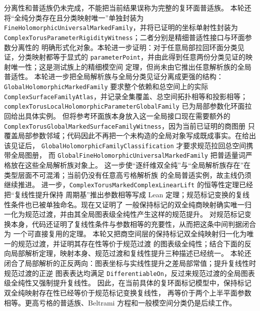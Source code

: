 \documentclass[UTF8,fontset=none,a4paper,11pt]{ctexart}
\begin{document}
分离性和普适族仍未完成，不能把当前结果误称为完整的复环面普适族。
本轮还将“全纯分类存在且分类映射唯一”单独封装为
\texttt{FineHolomorphicUniversalMarkedFamily}，并将已证明的坐标单射性封装为
\texttt{ComplexTorusParameterRigidityWitness}；二者分别是精细普适性接口与环面参数分离性的
明确形式化对象。本轮进一步证明：对于任意局部拉回环面分类见证，分类映射都等于显式的
\texttt{parameterPoint}，并由此得到任意两份分类见证的映射唯一性；这是测试族上的精细模空间
定理，但尚未由它推出任意解析族的全局普适性。
本轮进一步把全局解析族与全局分类见证分离成更强的结构：
\texttt{GlobalHolomorphicMarked\allowbreak Family} 要求整个依赖和总空间上的实际
\texttt{ComplexSurfaceFamily\allowbreak Atlas}，并记录全集覆盖、总空间拓扑相等和投影相等；
\texttt{complexTorusLocalHolomorphicParameter\allowbreak GlobalFamily} 已为局部参数化环面拉回给出具体实例。
但将参考环面族本身放入这一全局接口现在需要额外的
\texttt{ComplexTorusGlobalMarked\allowbreak SurfaceFamily\allowbreak Witness}，因为当前已证明的商图册
只覆盖局部参数邻域；代码因此不再把一个未构造的全局对象写成既成事实。在给出该见证后，
\texttt{GlobalHolomorphicFamily\allowbreak Classification} 才要求规范拉回总空间携带全局图册，
而 \texttt{GlobalFineHolomorphicUniversal\allowbreak MarkedFamily} 把普适量词严格放在这些全局解析族对象上。
这一步使“逐纤维双全纯”与“全局解析族存在”在类型层面不可混淆；当前仍没有任意高亏格解析族
的全局普适实例，故主线仍须继续推进。
进一步，\texttt{ComplexTorusMarkedComplexLinearLift} 的恒等性定理已经把“复线性提升保持
周期基”推出参数相等写成 Lean 定理；规范标记变换的复线性条件也已被单独命名。现在又证明了
一般保持标记的双全纯商映射确实唯一归一化为规范过渡，并由其全局图表级全纯性产生这样的规范提升。
对规范标记变换本身，代码还证明了复线性条件与参数相等的充要性，从而把这条中间判据闭合为
一个可直接复用的定理。
本轮又把商空间层的保持标记双全纯映射归一化为唯一的规范过渡，并证明其存在性等价于规范过渡
的图表级全纯性；结合下面的反向局部解析定理，映射本身、规范过渡和复线性提升三种描述已经统一。
本轮还闭合了局部解析的正反两向：图表坐标与实线性提升之差局部常值；提升复线性时规范过渡的正逆
图表表达均满足 \texttt{DifferentiableOn}，反过来规范过渡的全局图表级全纯性又强制提升复线性。
因此，在当前具体的复环面标记模型中，保持标记双全纯映射存在性已经等价于规范标记变换复线性，
再等价于两个上半平面参数相等。更高亏格的普适族、Beltrami 方程和一般模空间分类仍是后续工作。
\end{document}
